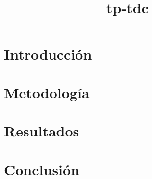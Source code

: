 \documentclass[hidelinks,a4paper,12pt, nofootinbib]{article}
\title{tp-tdc}
\begin{document}
\maketitle

\tableofcontents
\newpage


\section{Introducción}

\newpage

\section{Metodología}

\newpage

\section{Resultados}

\newpage

\section{Conclusión}

\end{document}
